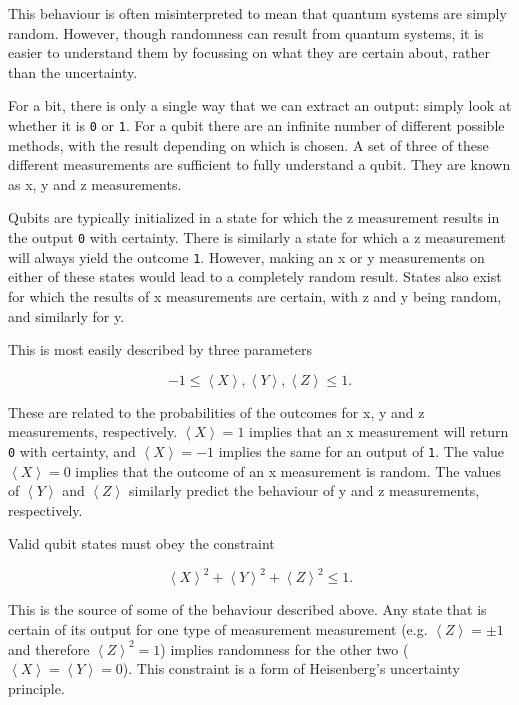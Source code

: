 \documentclass[conference]{IEEEtran}
\begin{document}
This behaviour is often misinterpreted to mean that quantum systems are simply random. However, though randomness can result from quantum systems, it is easier to understand them by focussing on what they are certain about, rather than the uncertainty.

For a bit, there is only a single way that we can extract an output: simply look at whether it is \texttt{0} or \texttt{1}. For a qubit there are an infinite number of different possible methods, with the result depending on which is chosen. A set of three of these different measurements are sufficient to fully understand a qubit. They are known as x, y and z measurements.

Qubits are typically initialized in a state for which the z measurement results in the output \texttt{0} with certainty. There is similarly a state for which a z measurement will always yield the outcome \texttt{1}. However, making an x or y measurements on either of these states would lead to a completely random result. States also exist for which the results of x measurements are certain, with z and y being random, and similarly for y.

This is most easily described by three parameters

$$-1 \leq \left\langle X\right\rangle, \left\langle Y\right\rangle, \left\langle Z\right\rangle \leq 1.$$

These are related to the probabilities of the outcomes for x, y and z measurements, respectively. $\left\langle X\right\rangle=1$ implies that an x measurement will return \texttt{0} with certainty, and $\left\langle X\right\rangle=-1$ implies the same for an output of \texttt{1}. The value $\left\langle X\right\rangle=0$ implies that the outcome of an x measurement is random. The values of  $\left\langle Y\right\rangle$ and  $\left\langle Z\right\rangle $ similarly predict the behaviour of y and z measurements, respectively.

Valid qubit states must obey the constraint

\begin{equation} \label{heisenberg}
\left\langle X\right\rangle^2 + \left\langle Y\right\rangle^2 + \left\langle Z\right\rangle^2 \leq 1.
\end{equation}

This is the source of some of the behaviour described above. Any state that is certain of its output for one type of measurement measurement (e.g. $\left\langle Z\right\rangle = \pm 1$ and therefore $\left\langle Z\right\rangle^2 = 1$) implies randomness for the other two ($\left\langle X\right\rangle = \left\langle Y\right\rangle = 0$). This constraint is a form of Heisenberg's uncertainty principle.
\end{document}
